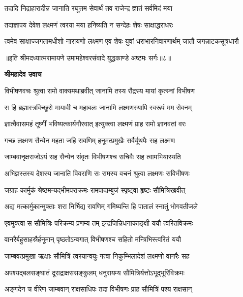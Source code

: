 \twolineshloka
{तदादि निद्राहारादीन्न जानाति रघूत्तम}
{सेवार्थं तव राजेन्द्र ज्ञातं सर्वमिदं मया} %

\twolineshloka
{तदाज्ञापय देवेश लक्ष्मणं त्वरया मया}
{हनिष्यति न सन्देहः शेषः साक्षाद्धराधरः} %

\fourlineindentedshloka
{त्वमेव साक्षाज्जगतामधीशो}
{नारायणो लक्ष्मण एव शेषः}
{युवां धराभारनिवारणार्थम्}
{जातौ जगन्नाटकसूत्रधारौ} %

{॥इति श्रीमदध्यात्मरामायणे उमामहेश्वरसंवादे युद्धकाण्डे अष्टमः
सर्गः॥८॥
}




\textbf{श्रीमहादेव उवाच}

\twolineshloka
{विभीषणवचः श्रुत्वा रामो वाक्यमथाब्रवीत्}
{जानामि तस्य रौद्रस्य मायां कृत्स्नां विभीषण} %

\twolineshloka
{स हि ब्रह्मास्त्रविच्छूरो मायावी च महाबलः}
{जानामि लक्ष्मणस्यापि स्वरूपं मम सेवनम्} %

\twolineshloka
{ज्ञात्वैवासमहं तूष्णीं भविष्यत्कार्यगौरवात्}
{इत्युक्त्वा लक्ष्मणं प्राह रामो ज्ञानवतां वरः} %

\twolineshloka
{गच्छ लक्ष्मण सैन्येन महता जहि रावणिम्}
{हनूमत्प्रमुखैः सर्वैर्यूथपैः सह लक्ष्मण} %

\twolineshloka
{जाम्बवानृक्षराजोऽयं सह सैन्येन संवृतः}
{विभीषणश्च सचिवैः सह त्वामभियास्यति} %

\twolineshloka
{अभिज्ञस्तस्य देशस्य जानाति विवराणि सः}
{रामस्य वचनं श्रुत्वा लक्ष्मणः सविभीषणः} %

\twolineshloka
{जग्राह कार्मुकं श्रेष्ठमन्यद्भीमपराक्रमः}
{रामपादाम्बुजं स्पृष्ट्वा हृष्टः सौमित्रिरब्रवीत्} %

\twolineshloka
{अद्य मत्कार्मुकान्मुक्ताः शरा निर्भिद्य रावणिम्}
{गमिष्यन्ति हि पातालं स्नातुं भोगवतीजले} %

\twolineshloka
{एवमुक्त्वा स सौमित्रिः परिक्रम्य प्रणम्य तम्}
{इन्द्रजिन्निधनाकाङ्क्षी ययौ त्वरितविक्रमः} %

\twolineshloka
{वानरैर्बहुसाहस्रैर्हनूमान् पृष्ठतोऽन्वगात्}
{विभीषणश्च सहितो मन्त्रिभिस्त्वरितं ययौ} %

\twolineshloka
{जाम्बवत्प्रमुखा ऋक्षाः सौमित्रिं त्वरयान्वयुः}
{गत्वा निकुम्भिलादेशं लक्ष्मणो वानरैः सह} %

\twolineshloka
{अपश्यद्बलसङ्घातं दूराद्राक्षससङ्कुलम्}
{धनुरायम्य सौमित्रिर्यत्तोऽभूद्भूरिविक्रमः} %

\twolineshloka
{अङ्गदेन च वीरेण जाम्बवान् राक्षसाधिपः}
{तदा विभीषणः प्राह सौमित्रिं पश्य राक्षसान्} %

